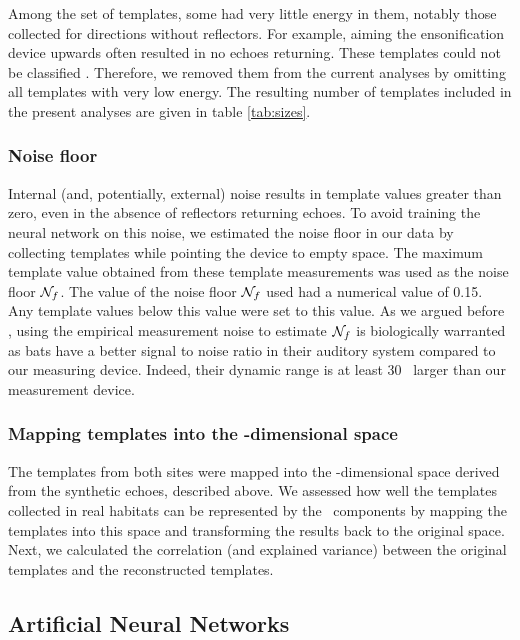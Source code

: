 \documentclass[preprint,5p]{elsarticle}
\begin{document}
Among the set of templates, some had very little energy in them, notably those collected for directions without reflectors. For example, aiming the ensonification device upwards often resulted in no echoes returning. These templates could not be classified \citep{Vanderelst2016}. Therefore, we removed them from the current analyses by omitting all templates with very low energy. The resulting number of templates included in the present analyses are given in table \ref{tab:sizes}.

\subsubsection{Noise floor}

Internal (and, potentially, external) noise results in template values greater than zero, even in the absence of reflectors returning echoes. To avoid training the neural network on this noise, we estimated the noise floor in our data by collecting templates while pointing the device to empty space. The maximum template value obtained from these template measurements was used as the noise floor $\mathcal{N}_f$. The value of the noise floor $\mathcal{N}_f$ used had a numerical value of 0.15. Any template values below this value were set to this value. As we argued before \citep{Vanderelst2016}, using the empirical measurement noise to estimate $\mathcal{N}_f$ is biologically warranted as bats have a better signal to noise ratio in their auditory system compared to our measuring device. Indeed, their dynamic range is at least 30 \db\ larger than our measurement device.

\subsubsection{Mapping templates into the \pca-dimensional space}

The templates from both sites were mapped into the \pca-dimensional space derived from the synthetic echoes, described above. We assessed how well the templates collected in real habitats can be represented by the \pca\ components by mapping the templates into this space and transforming the results back to the original space. Next, we calculated the correlation (and explained variance) between the original templates and the reconstructed templates.

\subsection{Artificial Neural Networks}
\end{document}
